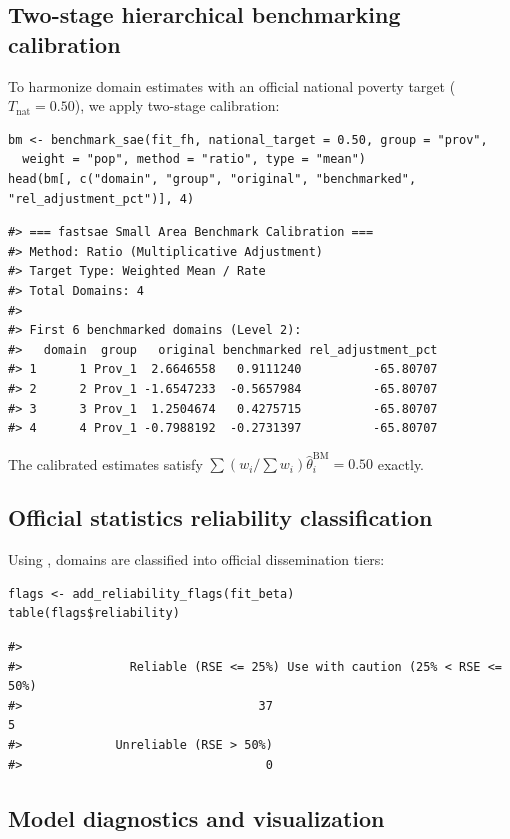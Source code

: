 \subsection{Two-stage hierarchical benchmarking calibration}

To harmonize domain estimates with an official national poverty target (\(T_{\text{nat}} = 0.50\)), we apply two-stage calibration:

\begin{verbatim}
bm <- benchmark_sae(fit_fh, national_target = 0.50, group = "prov",
  weight = "pop", method = "ratio", type = "mean")
head(bm[, c("domain", "group", "original", "benchmarked", "rel_adjustment_pct")], 4)
\end{verbatim}

\begin{verbatim}
#> === fastsae Small Area Benchmark Calibration ===
#> Method: Ratio (Multiplicative Adjustment) 
#> Target Type: Weighted Mean / Rate 
#> Total Domains: 4 
#> 
#> First 6 benchmarked domains (Level 2):
#>   domain  group   original benchmarked rel_adjustment_pct
#> 1      1 Prov_1  2.6646558   0.9111240          -65.80707
#> 2      2 Prov_1 -1.6547233  -0.5657984          -65.80707
#> 3      3 Prov_1  1.2504674   0.4275715          -65.80707
#> 4      4 Prov_1 -0.7988192  -0.2731397          -65.80707
\end{verbatim}

The calibrated estimates satisfy \(\sum (w_i / \sum w_i) \hat{\theta}_i^{\text{BM}} = 0.50\) exactly.

\subsection{Official statistics reliability classification}

Using , domains are classified into official dissemination tiers:

\begin{verbatim}
flags <- add_reliability_flags(fit_beta)
table(flags$reliability)
\end{verbatim}

\begin{verbatim}
#> 
#>               Reliable (RSE <= 25%) Use with caution (25% < RSE <= 50%) 
#>                                 37                                  5 
#>             Unreliable (RSE > 50%) 
#>                                  0
\end{verbatim}

\subsection{Model diagnostics and visualization}

